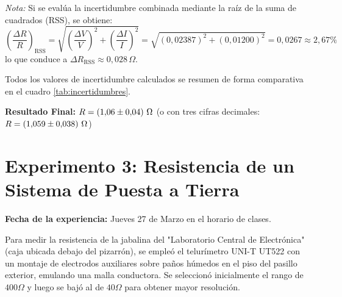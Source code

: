 \textit{Nota:} Si se evalúa la incertidumbre combinada mediante la raíz de la suma de cuadrados (RSS), se obtiene:
\begin{equation}
    \left(\frac{\Delta R}{R}\right)_{\text{RSS}} = \sqrt{\left(\frac{\Delta V}{V}\right)^2 + \left(\frac{\Delta I}{I}\right)^2} = \sqrt{(0{,}02387)^2 + (0{,}01200)^2} = 0{,}0267 \approx 2{,}67\percent
\end{equation}
lo que conduce a $\Delta R_{\text{RSS}} \approx 0{,}028\,\Omega$.

Todos los valores de incertidumbre calculados se resumen de forma comparativa en el cuadro \ref{tab:incertidumbres}.

\begin{table}[!ht]
    \centering
    \caption{Desglose de valores de medición e incertidumbre por el método de 4 terminales.}
    \label{tab:incertidumbres}
\end{table}

\textbf{Resultado Final:} $R = (1{,}06 \pm 0{,}04)\,\ohm$ \quad (o con tres cifras decimales: $R = (1{,}059 \pm 0{,}038)\,\ohm$)

\section{Experimento 3: Resistencia de un Sistema de Puesta a Tierra}
\textbf{Fecha de la experiencia:} Jueves 27 de Marzo en el horario de clases.

Para medir la resistencia de la jabalina del "Laboratorio Central de Electrónica" (caja ubicada debajo del pizarrón), se
empleó el telurímetro UNI-T UT522 con un montaje de electrodos auxiliares sobre paños húmedos en el piso del pasillo
exterior, emulando una malla conductora. Se seleccionó inicialmente el rango de $400 \Omega$ y luego se bajó al de
$40 \Omega$ para obtener mayor resolución.

